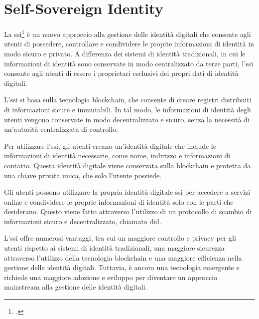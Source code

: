 \section{Self-Sovereign Identity}

La \acrfull{ssi}\footcite{site:ssi} è un nuovo approccio alla gestione delle identità digitali che consente agli utenti di possedere, controllare e condividere le proprie informazioni di identità in modo sicuro e privato. A differenza dei sistemi di identità tradizionali, in cui le informazioni di identità sono conservate in modo centralizzato da terze parti, l'\acrshort{ssi} consente agli utenti di essere i proprietari esclusivi dei propri dati di identità digitali.

L'\acrshort{ssi} si basa sulla tecnologia blockchain, che consente di creare registri distribuiti di informazioni sicure e immutabili. In tal modo, le informazioni di identità degli utenti vengono conservate in modo decentralizzato e sicuro, senza la necessità di un'autorità centralizzata di controllo.

Per utilizzare l'\acrshort{ssi}, gli utenti creano un'identità digitale che include le informazioni di identità necessarie, come nome, indirizzo e informazioni di contatto. Questa identità digitale viene conservata sulla blockchain e protetta da una chiave privata unica, che solo l'utente possiede.

Gli utenti possono utilizzare la propria identità digitale \acrshort{ssi} per accedere a servizi online e condividere le proprie informazioni di identità solo con le parti che desiderano. Questo viene fatto attraverso l'utilizzo di un protocollo di scambio di informazioni sicuro e decentralizzato, chiamato \acrfull{did}.

L'\acrshort{ssi} offre numerosi vantaggi, tra cui un maggiore controllo e privacy per gli utenti rispetto ai sistemi di identità tradizionali, una maggiore sicurezza attraverso l'utilizzo della tecnologia blockchain e una maggiore efficienza nella gestione delle identità digitali. Tuttavia, è ancora una tecnologia emergente e richiede una maggiore adozione e sviluppo per diventare un approccio mainstream alla gestione delle identità digitali.
